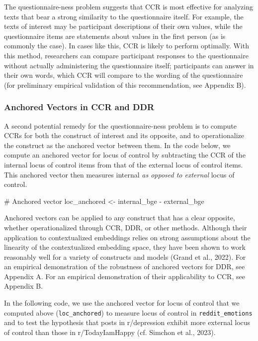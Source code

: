 \documentclass[
  man,
  floatsintext,
  longtable,
  nolmodern,
  notxfonts,
  notimes,
  colorlinks=true,linkcolor=blue,citecolor=blue,urlcolor=blue]{apa7}
\newenvironment{Shaded}{\begin{snugshade}}{\end{snugshade}}
\newcommand{\CommentTok}[1]{\textcolor[rgb]{0.37,0.37,0.37}{#1}}
\newcommand{\NormalTok}[1]{\textcolor[rgb]{0.00,0.23,0.31}{#1}}
\newcommand{\OtherTok}[1]{\textcolor[rgb]{0.00,0.23,0.31}{#1}}
\newcommand{\SpecialCharTok}[1]{\textcolor[rgb]{0.37,0.37,0.37}{#1}}
\begin{document}
The questionnaire-ness problem suggests that CCR is most effective for
analyzing texts that bear a strong similarity to the questionnaire
itself. For example, the texts of interest may be participant
descriptions of their own values, while the questionnaire items are
statements about values in the first person (as is commonly the case).
In cases like this, CCR is likely to perform optimally. With this
method, researchers can compare participant responses to the
questionnaire without actually administering the questionnaire itself;
participants can answer in their own words, which CCR will compare to
the wording of the questionnaire (for preliminary empirical validation
of this recommendation, see Appendix B).

\subsubsection{Anchored Vectors in CCR and
DDR}\label{anchored-vectors-in-ccr-and-ddr}

A second potential remedy for the questionnaire-ness problem is to
compute CCRs for both the construct of interest and its opposite, and to
operationalize the construct as the anchored vector between them. In the
code below, we compute an anchored vector for locus of control by
subtracting the CCR of the internal locus of control items from that of
the external locus of control items. This anchored vector then measures
internal \emph{as opposed to external} locus of control.

\begin{Shaded}
\begin{Highlighting}[]
\CommentTok{\# Anchored vector}
\NormalTok{loc\_anchored }\OtherTok{\textless{}{-}}\NormalTok{ internal\_bge }\SpecialCharTok{{-}}\NormalTok{ external\_bge}
\end{Highlighting}
\end{Shaded}

Anchored vectors can be applied to any construct that has a clear
opposite, whether operationalized through CCR, DDR, or other methods.
Although their application to contextualized embeddings relies on strong
assumptions about the linearity of the contextualized embedding space,
they have been shown to work reasonably well for a variety of constructs
and models (Grand et al., 2022). For an empirical demonstration of the
robustness of anchored vectors for DDR, see Appendix A. For an empirical
demonstration of their applicability to CCR, see Appendix B.

In the following code, we use the anchored vector for locus of control
that we computed above (\texttt{loc\_anchored}) to measure locus of
control in \texttt{reddit\_emotions} and to test the hypothesis that
posts in r/depression exhibit more external locus of control than those
in r/TodayIamHappy (cf. Simchon et al., 2023).
\end{document}
